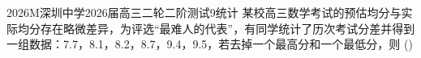 
\begin{problem}{2026}{M}{深圳中学2026届高三二轮二阶测试}{9}{统计}
某校高三数学考试的预估均分与实际均分存在略微差异，为评选“最难人的代表”，有同学统计了历次考试分差并得到一组数据：7.7，8.1，8.2，8.7，9.4，9.5，若去掉一个最高分和一个最低分，则 (\hspace{1cm})
\begin{choices}
\end{choices}
\end{problem}